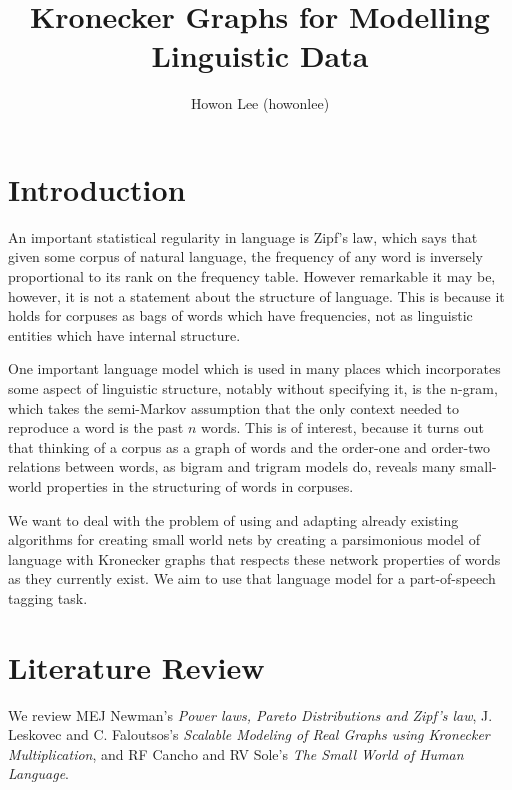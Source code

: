 \documentclass[12pt]{article}
\begin{document}
\title{Kronecker Graphs for Modelling Linguistic Data}
\author{Howon Lee (howonlee)}
\maketitle

\section{Introduction}


An important statistical regularity in language is Zipf's law, which says that given some corpus of natural language, the frequency of any word is inversely proportional to its rank on the frequency table. However remarkable it may be, however, it is not a statement about the structure of language. This is because it holds for corpuses as bags of words which have frequencies, not as linguistic entities which have internal structure. \cite{smallworldlang}

One important language model which is used in many places which incorporates some aspect of linguistic structure, notably without specifying it, is the n-gram, which takes the semi-Markov assumption that the only context needed to reproduce a word is the past $n$ words. This is of interest, because it turns out that thinking of a corpus as a graph of words and the order-one and order-two relations between words, as bigram and trigram models do, reveals many small-world properties in the structuring of words in corpuses.

We want to deal with the problem of using and adapting already existing algorithms for creating small world nets by creating a parsimonious model of language with Kronecker graphs that respects these network properties of words as they currently exist. We aim to use that language model for a part-of-speech tagging task.

\section{Literature Review}

We review MEJ Newman's \emph{Power laws, Pareto Distributions and Zipf's law}\cite{mejpowerlaw}, J. Leskovec and C. Faloutsos's \emph{Scalable Modeling of Real Graphs using Kronecker Multiplication}\cite{kronfit}, and RF Cancho and RV Sole's \emph{The Small World of Human Language}\cite{smallworldlang}.
\end{document}

